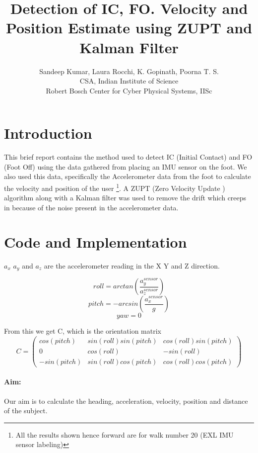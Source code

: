 \documentclass[12pt]{article}
\title{Detection of IC, FO. Velocity and Position Estimate using ZUPT and Kalman Filter}
\author{Sandeep Kumar, Laura Rocchi, K. Gopinath, Poorna T. S.\\
CSA, Indian Institute of Science\\
Robert Bosch Center for Cyber Physical Systems, IISc
}
\begin{document}
\maketitle

\section*{Introduction}
This brief report contains the method used to detect IC (Initial Contact) and FO (Foot Off) using the data gathered from placing an IMU sensor on the foot. We also used this data, specifically the Accelerometer data from the foot to calculate the velocity and  position of the user \footnote{All the results shown hence forward are for walk number 20 (EXL IMU sensor labeling)}. A ZUPT (Zero Velocity Update ) algorithm along with a Kalman filter was used to remove the drift which creeps in because of the noise present in the accelerometer data.

\section*{Code and Implementation}

$ a_x $ $ a_y $ and $ a_z $ are the accelerometer reading in the X Y and Z direction. 

\begin{equation}
roll = arctan(\frac{a_y^{sensor}}{a_z^{sensor}})
\end{equation}
\begin{equation}
pitch=-arcsin(\frac{a_x^{sensor}}{g})
\end{equation}
\begin{equation}
yaw=0
\end{equation}

From this we get C, which is the orientation matrix
\begin{equation}
C = \begin{pmatrix}
cos(pitch) & sin(roll)sin(pitch) & cos(roll)sin(pitch)\\
0 & cos(roll) & -sin(roll)\\
-sin(pitch) & sin(roll)cos(pitch) & cos(roll)cos(pitch)
\end{pmatrix}
\end{equation}

\paragraph{Aim:}
Our aim is to calculate the heading, acceleration, velocity, position and distance of the subject.
\end{document}
